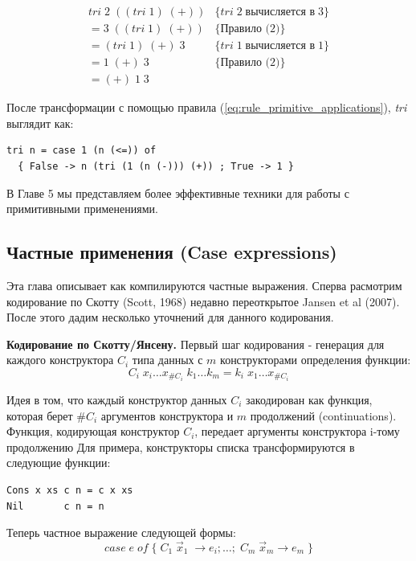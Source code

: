 \documentclass[flenqn, 14pt]{extarticle}
\begin{document}
\begin{align*}
& tri \; 2 \; ((tri \; 1) \; (+)) & \{ tri \; 2 \; \text{вычисляется в} \; 3 \} & \\
& = 3 \; ((tri \; 1) \; (+)) & \{ \text{Правило (2)} \} & \\
& = (tri \; 1) \; (+) \; 3 &  \{ tri \; 1 \; \text{вычисляется в} \; 1 \} & \\
& = 1 \; (+) \; 3 & \{ \text{Правило (2)} \} & \\
& = (+) \; 1 \; 3
\end{align*}

После трансформации с помощью правила (\ref{eq:rule_primitive_applications}), \textit{tri} выглядит как:
\begin{verbatim}
tri n = case 1 (n (<=)) of
  { False -> n (tri (1 (n (-))) (+)) ; True -> 1 }
\end{verbatim}

В Главе 5 мы представляем более эффективные техники для работы с примитивными применениями.

\subsection{Частные применения (Case expressions)}
Эта глава описывает как компилируются частные выражения. Сперва расмотрим кодирование по Скотту (Scott, 1968) недавно переоткрытое Jansen et al (2007). После этого дадим несколько уточнений для данного кодирования.

\textbf{Кодирование по Скотту/Янсену.} Первый шаг кодирования - генерация для каждого конструктора $C_i$ типа данных с $m$ конструкторами определения функции:
\begin{equation} \label{eq:scott_encoding_1}
C_i \; x_i \ldots x_{\#C_i} \; k_1 \ldots k_m = k_i \; x_1 \ldots x_{\#C_i}
\end{equation}

Идея в том, что каждый конструктор данных $C_i$ закодирован как функция, которая берет $\#C_i$ аргументов конструктора и $m$ продолжений (continuations). Функция, кодирующая конструктор $C_i$, передает аргументы конструктора i-тому продолжению Для примера, конструкторы списка трансформируются в следующие функции:

\begin{verbatim}
Cons x xs c n = c x xs
Nil       c n = n
\end{verbatim}

Теперь частное выражение следующей формы:
\begin{equation} \label{eq:scott_encoding_2}
case \; e \; of \; \{ \; C_1 \; \vec{x}_1 \; \rightarrow e_i ; \ldots ; \; C_m \; \vec{x}_m \rightarrow e_m \; \}
\end{equation}
\end{document}
